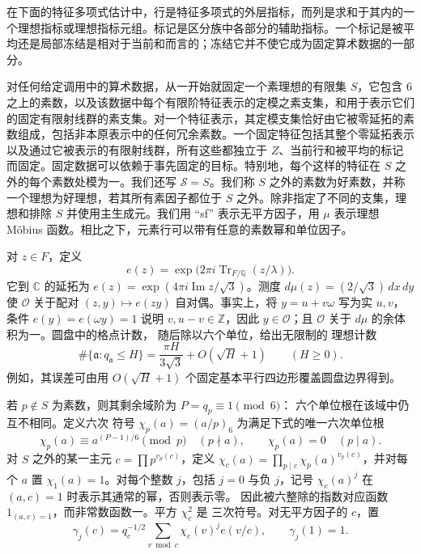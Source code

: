 \documentclass[11pt,a4paper]{article}
\numberwithin{equation}{section}
\numberwithin{figure}{section}
\theoremstyle{definition}
\theoremstyle{remark}
\begin{document}
在下面的特征多项式估计中，行是特征多项式的外层指标，而列是求和于其内的一个理想指标或理想指标元组。标记是区分族中各部分的辅助指标。一个标记是被平均还是局部冻结是相对于当前和而言的；冻结它并不使它成为固定算术数据的一部分。

对任何给定调用中的算术数据，从一开始就固定一个素理想的有限集 $S$，它包含 $6$ 之上的素数，以及该数据中每个有限阶特征表示的定模之素支集，和用于表示它们的固定有限射线群的素支集。对一个特征表示，其定模支集恰好由它被零延拓的素数组成，包括非本原表示中的任何冗余素数。一个固定特征包括其整个零延拓表示以及通过它被表示的有限射线群，所有这些都独立于 $Z$、当前行和被平均的标记而固定。固定数据可以依赖于事先固定的目标。特别地，每个这样的特征在 $S$ 之外的每个素数处模为一。我们还写 $\mathcal S=S$。我们称 $S$ 之外的素数为好素数，并称一个理想为好理想，若其所有素因子都位于 $S$ 之外。除非指定了不同的支集，理想和排除 $S$ 并使用主生成元。我们用 “sf” 表示无平方因子，用 $\mu$ 表示理想 M\"obius 函数。相比之下，元素行可以带有任意的素数幂和单位因子。

对 $z\in F$，定义
\[
 e(z)=\exp\bigl(2\pi i\operatorname{Tr}_{F/\mathbb Q}(z/\lambda)\bigr).
\]
它到 $\mathbb C$ 的延拓为
$e(z)=\exp(4\pi i\operatorname{Im}z/\sqrt3)$。测度
$d\mu(z)=(2/\sqrt3)\,dx\,dy$ 使 $\mathcal O$ 关于配对
$(z,y)\mapsto e(zy)$ 自对偶。事实上，将 $y=u+v\omega$ 写为实 $u,v$，条件
$e(y)=e(\omega y)=1$ 说明 $v,u-v\in\mathbb Z$，因此
$y\in\mathcal O$；且 $\mathcal O$ 关于 $d\mu$ 的余体积为一。圆盘中的格点计数，
随后除以六个单位，给出无限制的
理想计数
\[
 \#\{\mathfrak a:q_{\mathfrak a}\le H\}
 =\frac{\pi H}{3\sqrt3}+O(\sqrt H+1)\qquad(H\ge0).
\]
例如，其误差可由用
$O(\sqrt H+1)$ 个固定基本平行四边形覆盖圆盘边界得到。

若 $p\notin S$ 为素数，则其剩余域阶为 $P=q_p\equiv1\pmod6$：
六个单位根在该域中仍互不相同。定义六次
符号 $\chi_p(a)=(a/p)_6$ 为满足下式的唯一六次单位根
\[
 \chi_p(a)\equiv a^{(P-1)/6}\pmod p\quad(p\nmid a),
 \qquad \chi_p(a)=0\quad(p\mid a).
\]
对 $S$ 之外的某一主元 $c=\prod p^{v_p(c)}$，定义
$\chi_c(a)=\prod_{p\mid c}\chi_p(a)^{v_p(c)}$，并对每个
$a$ 置 $\chi_1(a)=1$。对每个整数 $j$，包括 $j=0$ 与负 $j$，记号
$\chi_c(a)^j$ 在 $(a,c)=1$ 时表示其通常的幂，否则表示零。
因此被六整除的指数对应函数
$1_{(a,c)=1}$，而非常数函数一。平方 $\chi_c^2$ 是
三次符号。对无平方因子的 $c$，置
\[
 \gamma_j(c)=q_c^{-1/2}\sum_{v\bmod c}\chi_c(v)^j e(v/c),
 \qquad \gamma_j(1)=1.
\]
\end{document}
